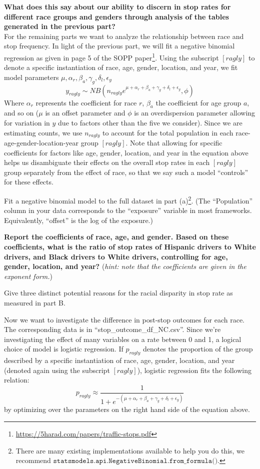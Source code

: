 \documentclass[preview]{standalone}
\begin{document}
\begin{Parts}
\textbf{What does this say about our ability to discern in stop rates for different race groups and genders through analysis of the tables generated in the previous part?} \\


 \Part For the remaining parts we want to analyze the relationship between race and stop frequency. In light of the previous part, we will fit a negative binomial regression as given in page 5 of the SOPP paper\footnote{\url{https://5harad.com/papers/traffic-stops.pdf}}. Using the subscript $[ragly]$ to denote a specific instantiation of race, age, gender, location, and year, we fit model parameters $\mu, \alpha_r,\beta_a,\gamma_g,\delta_l,\epsilon_y$
 \[
y_{ragly} \sim  NB\left( n_{ragly} e^{\mu + \alpha_r + \beta_a + \gamma_g + \delta_l + \epsilon_y}, \phi\right)
 \]
 Where $\alpha_r$ represents the coefficient for race $r$, $\beta_a$ the coefficient for age group $a$, and so on ($\mu$ is an offset parameter and $\phi$ is an overdispersion parameter allowing for variation in $y$ due to factors other than the five we consider). Since we are estimating counts, we use $n_{ragly}$ to account for the total population in each race-age-gender-location-year group $[ragly]$. Note that allowing for specific coefficients for factors like age, gender, location, and year in the equation above helps us disambiguate their effects on the overall stop rates in each $[ragly]$ group separately from the effect of race, so that we say such a model ``controls'' for these effects.

Fit a negative binomial model to the full dataset in part (a)\footnote{There are many existing implementations available to help you do this, we recommend $\texttt{statsmodels.api.NegativeBinomial.from\_formula()}$.}. (The “Population” column in your data corresponds to the “exposure” variable in most frameworks. Equivalently, “offset” is the log of the exposure.)

\textbf{Report the coefficients of race, age, and gender. Based on these coefficients, what is the ratio of stop rates of Hispanic drivers to White drivers, and Black drivers to White drivers, controlling for age, gender, location, and year?} (\textit{hint: note that the coefficients are given in the exponent form.})



\Part Give three distinct potential reasons for the racial disparity in stop rate as measured in part B.

\Part
Now we want to investigate the difference in post-stop outcomes for each race. The corresponding data is in ``stop\_outcome\_df\_NC.csv''. Since we're investigating the effect of many variables on a rate between 0 and 1, a logical choice of model is logistic regression. If $p_{ragly}
$ denotes the proportion of the group described by a specific instantiation of race, age, gender, location, and year (denoted again using the subscript $[ragly]$), logistic regression fits the following relation:
 \[
p_{ragly} \approx  \frac{1}{1 + e^{-\left(\mu + \alpha_r + \beta_a + \gamma_g + \delta_l + \epsilon_y\right)}}
 \]
by optimizing over the parameters on the right hand side of the equation above. 


\end{Parts}
\end{document}
